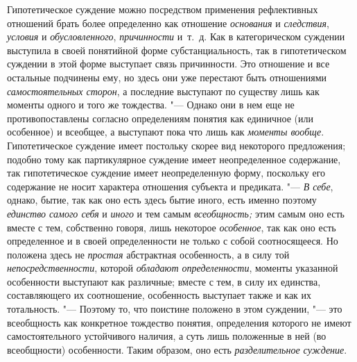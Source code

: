 Гипотетическое суждение можно посредством применения
рефлективных отношений брать более определенно как отношение
{\em основания} и {\em следствия}, {\em условия} и {\em обусловленного},
{\em причинности} и~т.~д.
Как в категорическом суждении выступила в своей понятийной форме
субстанциальность, так в гипотетическом суждении в этой форме выступает
связь причинности. Это отношение и все остальные подчинены ему, но здесь
они уже перестают быть отношениями
{\em самостоятельных сторон},
а последние выступают по существу лишь как моменты одного и
того же тождества. "--- Однако они в нем еще не
противопоставлены согласно определениям понятия как единичное (или
особенное) и всеобщее, а выступают пока что лишь как
{\em моменты вообще}.
Гипотетическое суждение имеет постольку скорее вид некоторого
предложения; подобно тому как партикулярное суждение имеет неопределенное
содержание, так гипотетическое суждение имеет неопределенную форму,
поскольку его содержание не носит характера отношения субъекта и
предиката. "--- {\em В себе},
однако, бытие, так как оно есть здесь бытие иного, есть
именно поэтому {\em единство самого
себя} и {\em иного}
и тем самым
{\em всеобщность;} этим
самым оно есть вместе с тем, собственно говоря, лишь некоторое
{\em особенное}, так как
оно есть определенное и в своей определенности не только с собой
соотносящееся. Но положена здесь не
{\em простая} абстрактная
особенность, а в силу той
{\em непосредственности},
которой {\em обладают
определенности}, моменты указанной особенности выступают как
различные; вместе с тем, в силу их единства, составляющего их соотношение,
особенность выступает также и как их тотальность. "---
Поэтому то, что поистине положено в этом суждении, "---
это всеобщность как конкретное тождество понятия,
определения которого не имеют самостоятельного устойчивого наличия, а суть
лишь положенные в ней (во всеобщности) особенности. Таким образом, оно есть
{\em разделительное суждение}.

